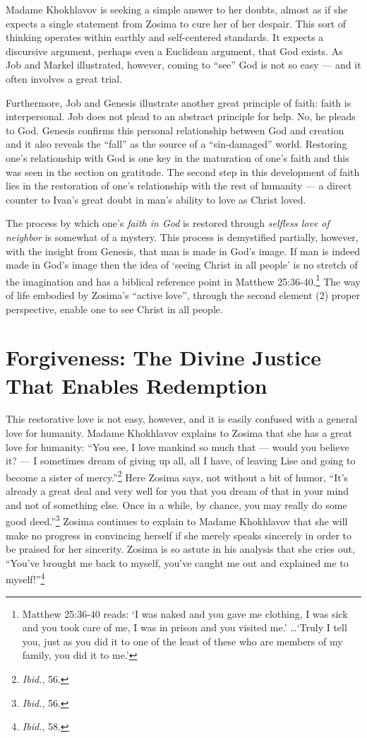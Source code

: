 Madame Khokhlavov is seeking a simple answer to her doubts, almost as if she expects a single statement from Zosima to cure her of her despair. This sort of thinking operates within earthly and self-centered standards. It expects a discursive argument, perhaps even a Euclidean argument, that God exists. As Job and Markel illustrated, however, coming to ``see'' God is not so easy --- and it often involves a great trial. 

Furthermore, Job and Genesis illustrate another great principle of faith: faith is interpersonal. Job does not plead to an abstract principle for help. No, he pleads to God. Genesis confirms this personal relationship between God and creation and it also reveals the ``fall'' as the source of a ``sin-damaged'' world. Restoring one's relationship with God is one key in the maturation of one's faith and this was seen in the section on gratitude. The second step in this development of faith lies in the restoration of one's relationship with the rest of humanity --- a direct counter to Ivan's great doubt in man's ability to love as Christ loved. 

The process by which one's \emph{faith in God} is restored through \emph{selfless love of neighbor} is somewhat of a mystery. This process is demystified partially, however, with the insight from Genesis, that man is made in God's image. If man is indeed made in God's image then the idea of `seeing Christ in all people' is no stretch of the imagination and has a biblical reference point in Matthew 25:36-40.\footnote{Matthew 25:36-40 reads: `I was naked and you gave me clothing, I was sick and you took care of me, I was in prison and you visited me.' \ldots `Truly I tell you, just as you did it to one of the least of these who are members of my family, you did it to me.'} The way of life embodied by Zosima's ``active love'', through the second element (2) proper perspective, enable one to see Christ in all people.

\section{Forgiveness: The Divine Justice That Enables Redemption}
This restorative love is not easy, however, and it is easily confused with a general love for humanity. Madame Khokhlavov explains to Zosima that she has a great love for humanity: ``You see, I love mankind so much that --- would you believe it? --- I sometimes dream of giving up all, all I have, of leaving Lise and going to become a sister of mercy.''\footnote{\emph{Ibid.}, 56.} Here Zosima says, not without a bit of humor, ``It's already a great deal and very well for you that you dream of that in your mind and not of something else. Once in a while, by chance, you may really do some good deed.''\footnote{\emph{Ibid.}, 56.} Zosima continues to explain to Madame Khokhlavov that she will make no progress in convincing herself if she merely speaks sincerely in order to be praised for her sincerity. Zosima is so astute in his analysis that she cries out, ``You've brought me back to myself, you've caught me out and explained me to myself!\thinspace''\footnote{\emph{Ibid.}, 58.}

